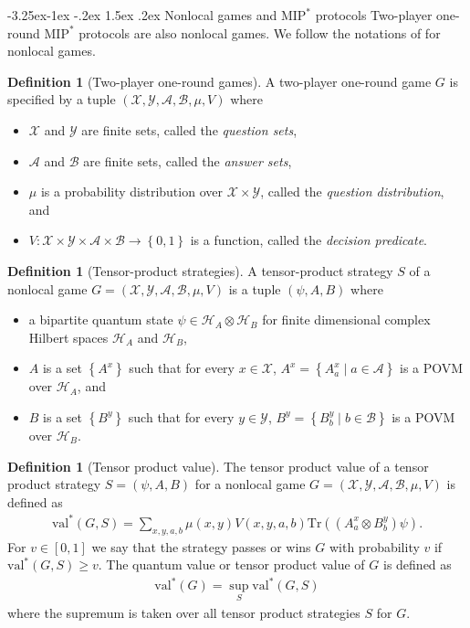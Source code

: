 \documentclass[11pt]{article}
\makeatletter
\renewcommand{\subsection}{\@startsection{subsection}{2}{\z@}%
             {-3.25ex\@plus -1ex \@minus -.2ex}%
             {1.5ex \@plus .2ex}%
             {\normalfont\large\scshape\bfseries}}
\theoremstyle{plain}
\theoremstyle{definition}
\newtheorem{definition}[theorem]{Definition}
\newcommand {\set} [1] {\ensuremath{ \left\lbrace #1 \right\rbrace }}
\newcommand {\br} [1] {\ensuremath{ \left( #1 \right) }}
\newcommand {\Tr} {\ensuremath{ \mathrm{Tr} }}
\newcommand{\x}{\otimes}
\newcommand{\calH}{\mathcal{H}}
\newcommand{\calX}{\mathcal{X}}
\newcommand{\calY}{\mathcal{Y}}
\newcommand{\calA}{\mathcal{A}}
\newcommand{\calB}{\mathcal{B}}
\newcommand{\1}{\mathbb{1}} %
\newcommand{\MIP}{\mathrm{MIP}}
\newcommand{\val}{\mathrm{val}}
\makeatother
\begin{document}
\subsection{Nonlocal games and \texorpdfstring{$\MIP^\ast$}{MIP*} protocols} 
Two-player one-round $\MIP^\ast$ protocols are also nonlocal games.
We follow the notations of \cite{JNVWY'20} for nonlocal games.
\begin{definition}[Two-player one-round games]
    A two-player one-round game $G$ is specified by a tuple $(\calX, \calY, \calA, \calB, \mu, V)$ where
    \begin{itemize}
        \item $\calX$ and $\calY$ are finite sets, called the \emph{question sets},
        \item $\calA$ and $\calB$ are finite sets, called the \emph{answer sets},
        \item $\mu$ is a probability distribution over $\calX \times \calY$, called the \emph{question distribution}, and
        \item $V: \calX \times \calY \times \calA \times \calB \to \set{0,1}$ is a function, called the \emph{decision predicate}.
    \end{itemize}
\end{definition}
\begin{definition}[Tensor-product strategies]
    A tensor-product strategy $S$ of a nonlocal game $G = (\calX, \calY, \calA, \calB, \mu, V)$ is a tuple 
    $(\psi, A, B)$ where
    \begin{itemize}
        \item a bipartite quantum state $\psi \in \calH_A \x \calH_B$ for finite dimensional complex Hilbert
spaces $\calH_A$ and $\calH_B$,
        \item $A$ is a set $\set{A^x}$ such that for every $x \in \calX$, $A^x = \set{A^x_a \mid a \in \calA}$ is 
        a POVM over $\calH_A$, and 
        \item $B$ is a set $\set{B^y}$ such that for every $y \in \calY$, $B^y = \set{B^y_b \mid b \in \calB}$ is 
        a POVM over $\calH_B$.
    \end{itemize}
\end{definition}
\begin{definition}[Tensor product value]
    The tensor product value of a tensor product strategy $S = (\psi, A ,B)$ for a nonlocal game
    $G = (\calX, \calY, \calA, \calB, \mu, V)$ is defined as
    \begin{align*}
        \val^\ast(G,S) = \sum_{x,y,a,b} \mu(x,y)V(x,y,a,b) \Tr\br{\br{A^x_a \x B^y_b}\psi}.
    \end{align*}
    For $v \in [0,1]$ we say that the strategy passes or wins $G$ with probability $v$ if $\val^\ast(G,S)\geq v$.
    The quantum value or tensor product value of $G$ is defined as
    \begin{align*}
        \val^*(G) = \sup_{S} \val^\ast(G,S)
    \end{align*}
    where the supremum is taken over all tensor product strategies $S$ for $G$.
\end{definition}
\end{document}
